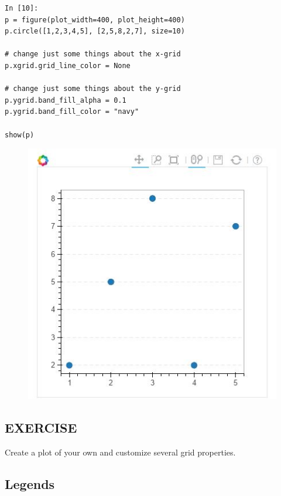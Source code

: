 \documentclass[a4paper,12pt]{article}
\begin{document}
\begin{framed}
	\begin{verbatim}
In [10]:
p = figure(plot_width=400, plot_height=400)
p.circle([1,2,3,4,5], [2,5,8,2,7], size=10)

# change just some things about the x-grid
p.xgrid.grid_line_color = None

# change just some things about the y-grid
p.ygrid.band_fill_alpha = 0.1
p.ygrid.band_fill_color = "navy"

show(p)
\end{verbatim}
\end{framed}
\begin{figure}[h!]
	\centering
	\includegraphics[width=0.7\linewidth]{images/04-grids-01}
\end{figure}
\subsection*{EXERCISE} Create a plot of your own and customize several grid properties.

\newpage
\subsection*{Legends}
\end{document}
